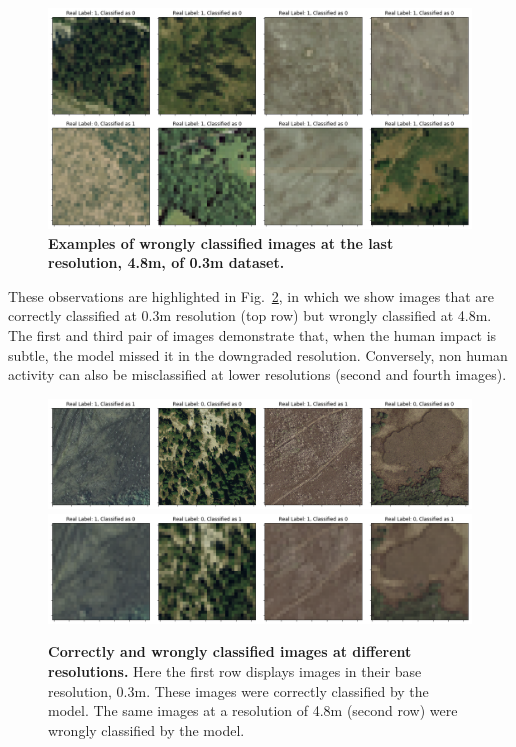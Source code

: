 \begin{figure}[H]
	\centering
	\captionsetup{width=1\linewidth}
	\includegraphics[width=1\textwidth]{Figures/results/class_dataset03m_res48_wrong.png}
	\caption{\textbf{Examples of wrongly classified images at the last resolution, 4.8m, of 0.3m dataset.}}
	\label{fig:dataset03m_res48_wrong}
\end{figure}

These observations are highlighted in Fig.~\ref{fig:dataset03m_res03_res48_comp}, in which we show images that are correctly classified at 0.3m resolution (top row) but wrongly classified at 4.8m. The first and third pair of images demonstrate that, when the human impact is subtle, the model missed it in the downgraded resolution. Conversely, non human activity can also be misclassified at lower resolutions (second and fourth images).

\begin{figure}[H]
	\centering
	\captionsetup{width=1\linewidth}
	\includegraphics[width=1\textwidth]{Figures/results/class_dataset03m_res03_comp_correct.png}
	\includegraphics[width=1\textwidth]{Figures/results/class_dataset03m_res48_comp_wrong.png}
	\caption{\textbf{Correctly and wrongly classified images at different resolutions.} Here the first row displays images in their base resolution, 0.3m. These images were correctly classified by the model. The same images at a resolution of 4.8m (second row) were wrongly classified by the model.}
	\label{fig:dataset03m_res03_res48_comp}
\end{figure}

